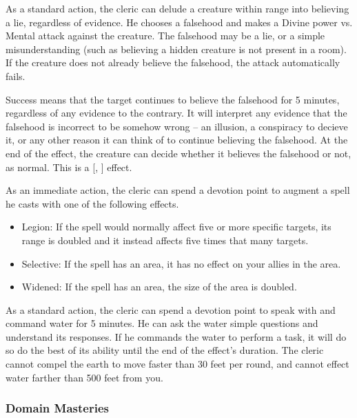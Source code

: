             As a standard action, the cleric can delude a creature within \rngmed range into believing a lie, regardless of evidence.
            He chooses a falsehood and makes a Divine power vs. Mental attack against the creature.
            The falsehood may be a lie, or a simple misunderstanding (such as believing a hidden creature is not present in a room).
            If the creature does not already believe the falsehood, the attack automatically fails.

            Success means that the target continues to believe the falsehood for 5 minutes, regardless of any evidence to the contrary.
            It will interpret any evidence that the falsehood is incorrect to be somehow wrong -- an illusion, a conspiracy to decieve it, or any other reason it can think of to continue believing the falsehood.
            At the end of the effect, the creature can decide whether it believes the falsehood or not, as normal.
            This is a [, ] effect.

            As an immediate action, the cleric can spend a devotion point to augment a spell he casts with one of the following effects.
            \begin{itemize}
                \item Legion: If the spell would normally affect five or more specific targets, its range is doubled and it instead affects five times that many targets.
                \item Selective: If the spell has an area, it has no effect on your allies in the area.
                \item Widened: If the spell has an area, the size of the area is doubled.
            \end{itemize}

            As a standard action, the cleric can spend a devotion point to speak with and command water for 5 minutes.
            He can ask the water simple questions and understand its responses.
            If he commands the water to perform a task, it will do so do the best of its ability until the end of the effect's duration.
            The cleric cannot compel the earth to move faster than 30 feet per round, and cannot effect water farther than 500 feet from you.

        \subsubsection{Domain Masteries}\label{Domain Masteries}

